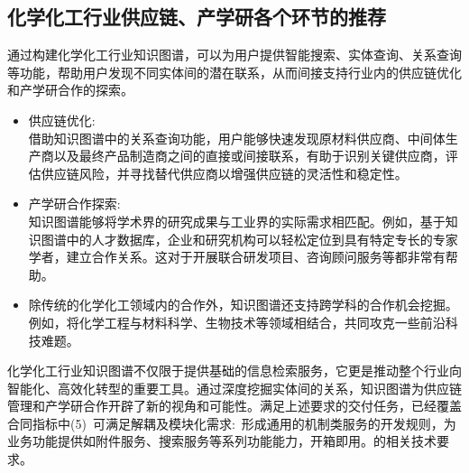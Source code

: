 \subsection{\hwfs 化学化工行业供应链、产学研各个环节的推荐} 
通过构建化学化工行业知识图谱，可以为用户提供智能搜索、实体查询、关系查询等功能，帮助用户发现不同实体间的潜在联系，从而间接支持行业内的供应链优化和产学研合作的探索。
\begin{itemize}
	\item 供应链优化:~\\
		借助知识图谱中的关系查询功能，用户能够快速发现原材料供应商、中间体生产商以及最终产品制造商之间的直接或间接联系，有助于识别关键供应商，评估供应链风险，并寻找替代供应商以增强供应链的灵活性和稳定性。
	\item 产学研合作探索:~\\
		知识图谱能够将学术界的研究成果与工业界的实际需求相匹配。例如，基于知识图谱中的人才数据库，企业和研究机构可以轻松定位到具有特定专长的专家学者，建立合作关系。这对于开展联合研发项目、咨询顾问服务等都非常有帮助。
	\item 除传统的化学化工领域内的合作外，知识图谱还支持跨学科的合作机会挖掘。例如，将化学工程与材料科学、生物技术等领域相结合，共同攻克一些前沿科技难题。
\end{itemize}
化学化工行业知识图谱不仅限于提供基础的信息检索服务，它更是推动整个行业向智能化、高效化转型的重要工具。通过深度挖掘实体间的关系，知识图谱为供应链管理和产学研合作开辟了新的视角和可能性。满足上述要求的交付任务，已经覆盖合同指标中{\heiti (5)~可满足解耦及模块化需求:~形成通用的机制类服务的开发规则，为业务功能提供如附件服务、搜索服务等系列功能能力，开箱即用。}的相关技术要求。

